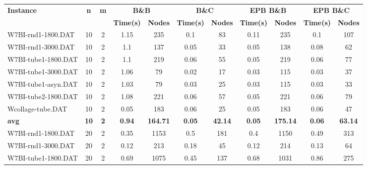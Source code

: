 \begin{table}[!ht]
\centering
\hspace*{-1cm}\begin{tabular}{lcccccccccc}
\toprule
\textbf{Instance} & \textbf{n} & \textbf{m} & \multicolumn{2}{c}{\textbf{B\&B}} & \multicolumn{2}{c}{\textbf{B\&C}}  & \multicolumn{2}{c}{\textbf{EPB B\&B}} & \multicolumn{2}{c}{\textbf{EPB B\&C}} \\

\cmidrule(r){4-5} \cmidrule(r){6-7} \cmidrule(r){8-9} \cmidrule(r){10-11} 
~ & ~ & ~ & \textbf{Time(s)} &\textbf{Nodes} & \textbf{Time(s)} &\textbf{Nodes} & \textbf{Time(s)} &\textbf{Nodes} & \textbf{Time(s)} &\textbf{Nodes}  \\
\midrule

W7BI-rnd1-1800.DAT & 10 & 2 & 1.15 & 235 &  \textcolor{blue2}{0.1} & 83 & 0.11 & 235 &  \textcolor{blue2}{0.1} & 107 \\
W7BI-rnd1-3000.DAT & 10 & 2 & 1.1 & 137 &  \textcolor{blue2}{0.05} & 33 &  \textcolor{blue2}{0.05} & 138 & 0.08 & 62 \\
W7BI-tube1-1800.DAT & 10 & 2 & 1.1 & 219 & 0.06 & 55 &  \textcolor{blue2}{0.05} & 219 & 0.06 & 77 \\
W7BI-tube1-3000.DAT & 10 & 2 & 1.06 & 79 &  \textcolor{blue2}{0.02} & 17 & 0.03 & 115 & 0.03 & 37 \\
W7BI-tube1-asyn.DAT & 10 & 2 & 1.03 & 79 &  \textcolor{blue2}{0.03} & 25 &  \textcolor{blue2}{0.03} & 115 &  \textcolor{blue2}{0.03} & 33 \\
W7BI-tube2-1800.DAT & 10 & 2 & 1.08 & 221 & 0.06 & 57 &  \textcolor{blue2}{0.05} & 221 & 0.06 & 79 \\
Wcollage-tube.DAT & 10 & 2 &  \textcolor{blue2}{0.05} & 183 & 0.06 & 25 &  \textcolor{blue2}{0.05} & 183 & 0.06 & 47 \\
\cline{1-11} \textbf{avg} & \textbf{10} & \textbf{2} & \textbf{0.94} & \textbf{164.71} & \textbf{0.05} & \textbf{42.14} & \textbf{0.05} & \textbf{175.14} & \textbf{0.06} & \textbf{63.14} \\ \cline{1-11}
W7BI-rnd1-1800.DAT & 20 & 2 &  \textcolor{blue2}{0.35} & 1153 & 0.5 & 181 & 0.4 & 1150 & 0.49 & 313 \\
W7BI-rnd1-3000.DAT & 20 & 2 &  \textcolor{blue2}{0.12} & 213 & 0.18 & 45 &  \textcolor{blue2}{0.12} & 214 & 0.13 & 64 \\
W7BI-tube1-1800.DAT & 20 & 2 & 0.69 & 1075 &  \textcolor{blue2}{0.45} & 137 & 0.68 & 1031 & 0.86 & 275 \\

\end{tabular}
\end{table}

